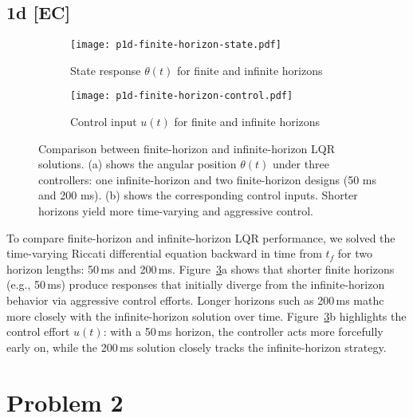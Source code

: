 \documentclass{article}
\begin{document}
 
\subsection*{1d [EC]}
\begin{figure}[H]
    \centering

    \begin{subfigure}[t]{0.45\textwidth}
        \centering
        \texttt{[image: p1d-finite-horizon-state.pdf]}
        \caption{State response $\theta(t)$ for finite and infinite horizons}
        \label{fig:p1d_theta}
    \end{subfigure}
    \hfill
    \begin{subfigure}[t]{0.45\textwidth}
        \centering
        \texttt{[image: p1d-finite-horizon-control.pdf]}
        \caption{Control input $u(t)$ for finite and infinite horizons}
        \label{fig:p1d_control}
    \end{subfigure}

    \caption{Comparison between finite-horizon and infinite-horizon LQR solutions. 
    (a) shows the angular position $\theta(t)$ under three controllers: one infinite-horizon and two finite-horizon designs (50 ms and 200 ms). 
    (b) shows the corresponding control inputs. Shorter horizons yield more time-varying and aggressive control.}
    \label{fig:p1d_finite_lqr}
\end{figure}
To compare finite-horizon and infinite-horizon LQR performance, we solved the time-varying Riccati differential equation backward in time from $t_f$ for two horizon lengths: 50\,ms and 200\,ms. Figure~\ref{fig:p1d_finite_lqr}a shows that shorter finite horizons (e.g., 50\,ms) produce responses that initially diverge from the infinite-horizon behavior via aggressive control efforts. Longer horizons such as 200\,ms mathc more closely with the infinite-horizon solution over time. Figure~\ref{fig:p1d_finite_lqr}b highlights the control effort $u(t)$: with a 50\,ms horizon, the controller acts more forcefully early on, while the 200\,ms solution closely tracks the infinite-horizon strategy.


\newpage
\section*{Problem 2}
\end{document}

